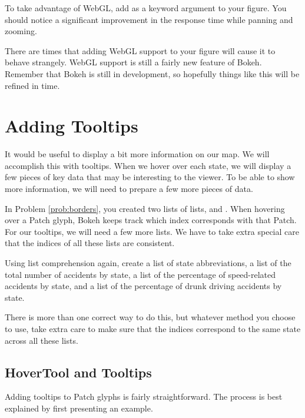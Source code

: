 \begin{problem} \label{prob:webgl}
To take advantage of WebGL, add  as a keyword argument to
your figure. You should notice a significant improvement in the response time
while panning and zooming.

\begin{info}
There are times that adding WebGL support to your figure will cause it to behave
strangely. WebGL support is still a fairly new feature of Bokeh. Remember
that Bokeh is still in development, so hopefully things like this will be refined
in time.
\end{info}
\end{problem}

\section*{Adding Tooltips}
It would be useful to display a bit more information on our map. We will
accomplish this with tooltips. When we hover over each state, we will display
a few pieces of key data that may be interesting to the viewer.
To be able to show more information, we will need to prepare a few more
pieces of data.

\begin{problem} \label{prob:lists}
In Problem \ref{prob:borders}, you created two lists of lists,  and
. When hovering over a Patch glyph, Bokeh keeps track which index
corresponds with that Patch. For our tooltips, we will need a few more lists. We
have to take extra special care that the indices of all these lists are
consistent.

Using list comprehension again, create a list of state abbreviations, a list of
the total number of accidents by state, a list of the percentage of speed-related
accidents by state, and a list of the percentage of drunk driving accidents by
state.

There is more than one correct way to do this, but whatever method you choose to
use, take extra care to make sure that the indices correspond to the same state
across all these lists.
\end{problem}

\subsection*{HoverTool and Tooltips}
Adding tooltips to Patch glyphs is fairly straightforward. The process is best
explained by first presenting an example.


